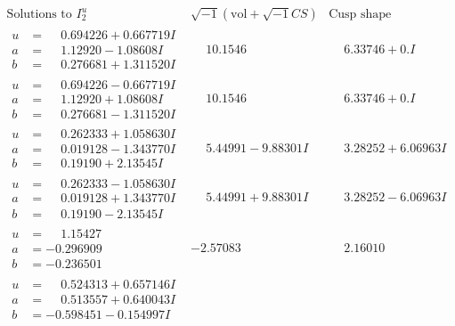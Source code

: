 \documentclass[1p]{elsarticle_modified}
\theoremstyle{definition}
\newcommand{\I}{\sqrt{-1}}
\begin{document}
$$\begin{array}{c|c|c}  
\text{Solutions to }I^u_{2}& \I (\text{vol} + \sqrt{-1}CS) & \text{Cusp shape}\\
 \hline 
\begin{aligned}
u &= \phantom{-}0.694226 + 0.667719 I \\
a &= \phantom{-}1.12920 - 1.08608 I \\
b &= \phantom{-}0.276681 + 1.311520 I\end{aligned}
 & \phantom{-}10.1546\phantom{ +0.000000I} & \phantom{-}6.33746 + 0. I\phantom{ +0.000000I} \\ \hline\begin{aligned}
u &= \phantom{-}0.694226 - 0.667719 I \\
a &= \phantom{-}1.12920 + 1.08608 I \\
b &= \phantom{-}0.276681 - 1.311520 I\end{aligned}
 & \phantom{-}10.1546\phantom{ +0.000000I} & \phantom{-}6.33746 + 0. I\phantom{ +0.000000I} \\ \hline\begin{aligned}
u &= \phantom{-}0.262333 + 1.058630 I \\
a &= \phantom{-}0.019128 - 1.343770 I \\
b &= \phantom{-}0.19190 + 2.13545 I\end{aligned}
 & \phantom{-}5.44991 - 9.88301 I & \phantom{-}3.28252 + 6.06963 I \\ \hline\begin{aligned}
u &= \phantom{-}0.262333 - 1.058630 I \\
a &= \phantom{-}0.019128 + 1.343770 I \\
b &= \phantom{-}0.19190 - 2.13545 I\end{aligned}
 & \phantom{-}5.44991 + 9.88301 I & \phantom{-}3.28252 - 6.06963 I \\ \hline\begin{aligned}
u &= \phantom{-}1.15427\phantom{ +0.000000I} \\
a &= -0.296909\phantom{ +0.000000I} \\
b &= -0.236501\phantom{ +0.000000I}\end{aligned}
 & -2.57083\phantom{ +0.000000I} & \phantom{-}2.16010\phantom{ +0.000000I} \\ \hline\begin{aligned}
u &= \phantom{-}0.524313 + 0.657146 I \\
a &= \phantom{-}0.513557 + 0.640043 I \\
b &= -0.598451 - 0.154997 I\end{aligned}

\end{array}$$
\end{document}
